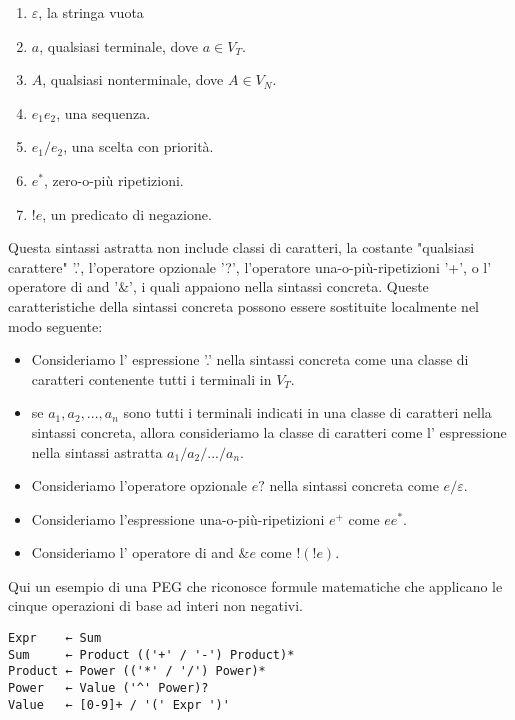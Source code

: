 \begin{enumerate}
	\item  $\varepsilon$, la stringa vuota
	\item $a$, qualsiasi terminale, dove $a \in V_T$.
	\item $A$, qualsiasi nonterminale, dove $A \in V_N$.
	\item $e_1 e_2$, una sequenza.
	\item $e_1 / e_2$, una scelta con priorità.
	\item $e^*$, zero-o-più ripetizioni.
	\item $!e$, un predicato di negazione.
\end{enumerate}
Questa sintassi astratta non include classi di caratteri, la costante "qualsiasi carattere" '.', l'operatore opzionale '?', l'operatore una-o-più-ripetizioni '+', o l' operatore di and '\&', i quali appaiono nella sintassi concreta. Queste caratteristiche della sintassi concreta possono essere sostituite localmente nel modo seguente:
\begin{itemize}
\item Consideriamo l' espressione '.' nella sintassi concreta come una classe di caratteri contenente tutti i terminali in $V_T$.
\item se $a_1,a_2,...,a_n$ sono tutti i terminali indicati in una classe di caratteri nella sintassi concreta, allora consideriamo la classe di caratteri come l' espressione nella sintassi astratta $a_1 / a_2 / ... / a_n$.
\item Consideriamo l'operatore opzionale $e?$ nella sintassi concreta come $e/\varepsilon$.
\item Consideriamo l'espressione una-o-più-ripetizioni $e^+$ come $ee^*$.
\item Consideriamo l' operatore di and $\&e$ come $!(!e)$.

\end{itemize}

Qui un esempio di una PEG che riconosce formule matematiche che applicano le cinque operazioni di base ad interi non negativi.
\begin{verbatim}
Expr    ← Sum
Sum     ← Product (('+' / '-') Product)*
Product ← Power (('*' / '/') Power)*
Power   ← Value ('^' Power)?
Value   ← [0-9]+ / '(' Expr ')'
\end{verbatim}

